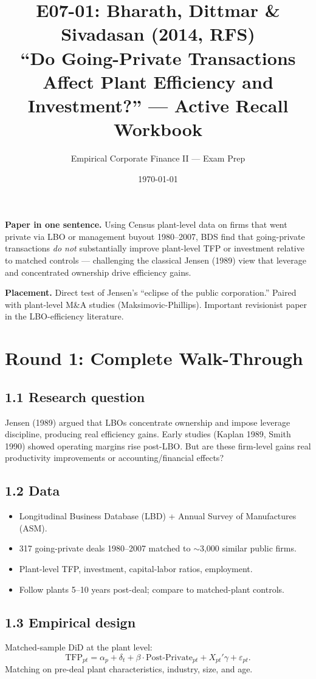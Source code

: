\documentclass[11pt]{article}
\title{E07-01: Bharath, Dittmar \& Sivadasan (2014, RFS) \\
\large ``Do Going-Private Transactions Affect Plant Efficiency and Investment?'' --- Active Recall Workbook}
\author{Empirical Corporate Finance II --- Exam Prep}
\date{\today}
\begin{document}
\maketitle

\begin{keybox}
\textbf{Paper in one sentence.} Using Census plant-level data on firms that went private via LBO or management buyout 1980--2007, BDS find that going-private transactions \emph{do not} substantially improve plant-level TFP or investment relative to matched controls --- challenging the classical Jensen (1989) view that leverage and concentrated ownership drive efficiency gains.

\textbf{Placement.} Direct test of Jensen's ``eclipse of the public corporation.'' Paired with plant-level M\&A studies (Maksimovic-Phillips). Important revisionist paper in the LBO-efficiency literature.
\end{keybox}

\section*{Round 1: Complete Walk-Through}

\subsection*{1.1 Research question}
Jensen (1989) argued that LBOs concentrate ownership and impose leverage discipline, producing real efficiency gains. Early studies (Kaplan 1989, Smith 1990) showed operating margins rise post-LBO. But are these firm-level gains real productivity improvements or accounting/financial effects?

\subsection*{1.2 Data}
\begin{itemize}
\item Longitudinal Business Database (LBD) + Annual Survey of Manufactures (ASM).
\item 317 going-private deals 1980--2007 matched to $\sim$3,000 similar public firms.
\item Plant-level TFP, investment, capital-labor ratios, employment.
\item Follow plants 5--10 years post-deal; compare to matched-plant controls.
\end{itemize}

\subsection*{1.3 Empirical design}
Matched-sample DiD at the plant level:
\[
\text{TFP}_{pt}=\alpha_p+\delta_t+\beta\cdot\text{Post-Private}_{pt}+X_{pt}'\gamma+\varepsilon_{pt}.
\]
Matching on pre-deal plant characteristics, industry, size, and age.
\end{document}
